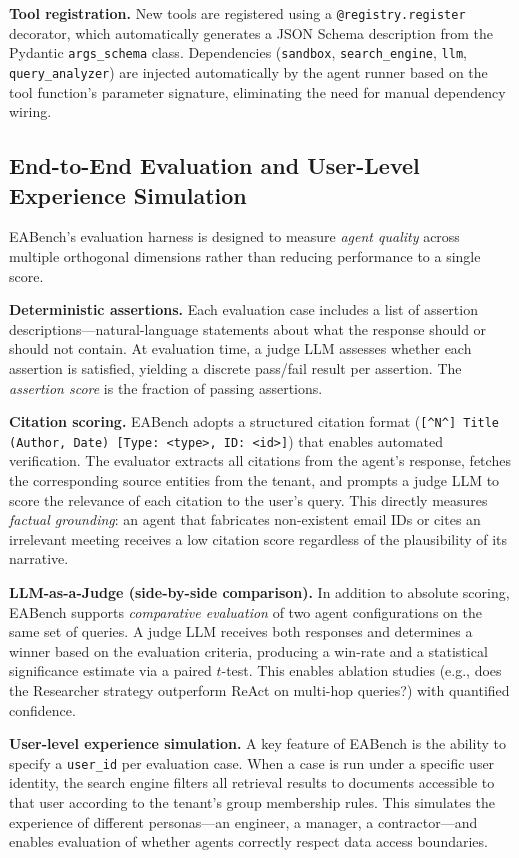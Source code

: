 \documentclass[10pt,twocolumn]{article}
\begin{document}
\textbf{Tool registration.}
New tools are registered using a \texttt{@registry.register} decorator, which
automatically generates a JSON Schema description from the Pydantic
\texttt{args\_schema} class.  Dependencies (\texttt{sandbox},
\texttt{search\_engine}, \texttt{llm}, \texttt{query\_analyzer}) are injected
automatically by the agent runner based on the tool function's parameter
signature, eliminating the need for manual dependency wiring.

\subsection{End-to-End Evaluation and User-Level Experience Simulation}
\label{sec:eval}

EABench's evaluation harness is designed to measure \emph{agent quality} across
multiple orthogonal dimensions rather than reducing performance to a single
score.

\textbf{Deterministic assertions.}
Each evaluation case includes a list of assertion descriptions---natural-language
statements about what the response should or should not contain.  At evaluation
time, a judge LLM assesses whether each assertion is satisfied, yielding a
discrete pass/fail result per assertion.  The \emph{assertion score} is the
fraction of passing assertions.

\textbf{Citation scoring.}
EABench adopts a structured citation format
(\texttt{[\^{}N\^{}] Title (Author, Date) [Type: <type>, ID: <id>]}) that
enables automated verification.  The evaluator extracts all citations from the
agent's response, fetches the corresponding source entities from the tenant,
and prompts a judge LLM to score the relevance of each citation to the user's
query.  This directly measures \emph{factual grounding}: an agent that
fabricates non-existent email IDs or cites an irrelevant meeting receives a low
citation score regardless of the plausibility of its narrative.

\textbf{LLM-as-a-Judge (side-by-side comparison).}
In addition to absolute scoring, EABench supports \emph{comparative evaluation}
of two agent configurations on the same set of queries.  A judge LLM receives
both responses and determines a winner based on the evaluation criteria,
producing a win-rate and a statistical significance estimate via a paired
$t$-test.  This enables ablation studies (e.g., does the Researcher strategy
outperform ReAct on multi-hop queries?) with quantified confidence.

\textbf{User-level experience simulation.}
A key feature of EABench is the ability to specify a \texttt{user\_id} per
evaluation case.  When a case is run under a specific user identity, the search
engine filters all retrieval results to documents accessible to that user
according to the tenant's group membership rules.  This simulates the
experience of different personas---an engineer, a manager, a contractor---and
enables evaluation of whether agents correctly respect data access boundaries.
\end{document}
